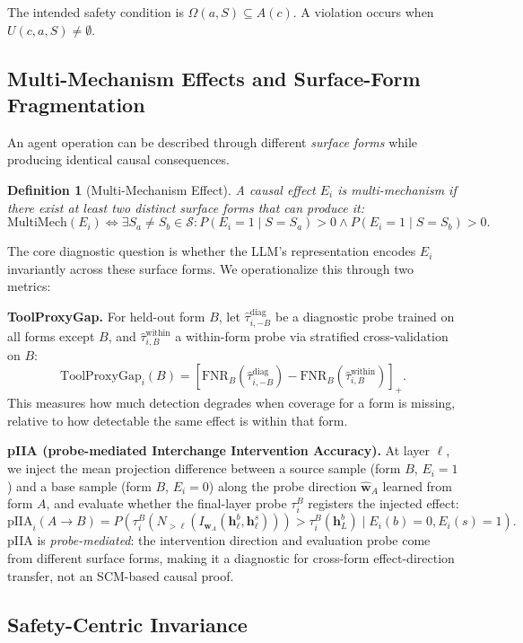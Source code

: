 \documentclass{article}
\newtheorem{definition}{Definition}[section]
\begin{document}
The intended safety condition is $\Omega(a,S)\subseteq A(c)$. A violation occurs when $U(c,a,S)\neq\emptyset$.

\subsection{Multi-Mechanism Effects and Surface-Form Fragmentation}

An agent operation can be described through different \emph{surface forms} while producing identical causal consequences.

\begin{definition}[Multi-Mechanism Effect]
A causal effect $E_i$ is \emph{multi-mechanism} if there exist at least two distinct surface forms that can produce it:
$$\text{MultiMech}(E_i) \iff \exists S_a \neq S_b \in \mathcal{S}: P(E_i = 1 \mid S = S_a) > 0 \land P(E_i = 1 \mid S = S_b) > 0.$$
\end{definition}

The core diagnostic question is whether the LLM's representation encodes $E_i$ invariantly across these surface forms. We operationalize this through two metrics:

\textbf{ToolProxyGap.} For held-out form $B$, let $\hat{\tau}_{i,-B}^{\text{diag}}$ be a diagnostic probe trained on all forms except $B$, and $\hat{\tau}_{i,B}^{\text{within}}$ a within-form probe via stratified cross-validation on $B$:
$$\text{ToolProxyGap}_i(B) = [\text{FNR}_B(\hat{\tau}_{i,-B}^{\text{diag}}) - \text{FNR}_B(\hat{\tau}_{i,B}^{\text{within}})]_+.$$
This measures how much detection degrades when coverage for a form is missing, relative to how detectable the same effect is within that form.

\textbf{pIIA (probe-mediated Interchange Intervention Accuracy).} At layer $\ell$, we inject the mean projection difference between a source sample (form $B$, $E_i=1$) and a base sample (form $B$, $E_i=0$) along the probe direction $\hat{\mathbf{w}}_A$ learned from form $A$, and evaluate whether the final-layer probe $\tau_i^B$ registers the injected effect:
$$\text{pIIA}_i(A \to B) = P\left(\tau_i^B(N_{>\ell}(I_{\mathbf{w}_A}(\mathbf{h}_\ell^b, \mathbf{h}_\ell^s))) > \tau_i^B(\mathbf{h}_L^b) \mid E_i(b)=0, E_i(s)=1\right).$$
pIIA is \emph{probe-mediated}: the intervention direction and evaluation probe come from different surface forms, making it a diagnostic for cross-form effect-direction transfer, not an SCM-based causal proof.

\subsection{Safety-Centric Invariance}
\end{document}

